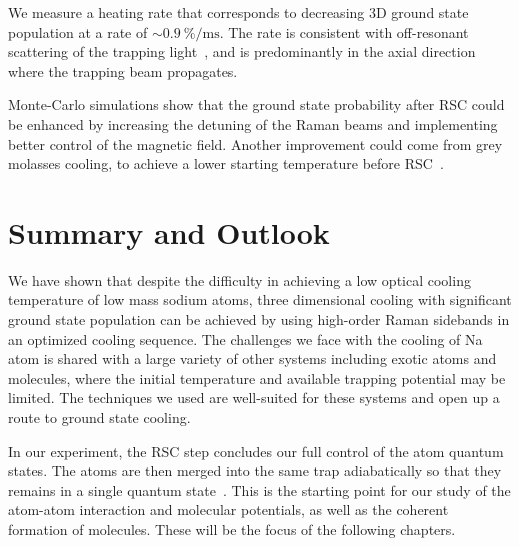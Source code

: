 We measure a heating rate that corresponds to decreasing 3D ground state population
at a rate of $\sim0.9~\mathrm{\%/ms}$.
The rate is consistent with off-resonant scattering of
the trapping light~\cite{grimm_optical_2000},
and is predominantly in the axial direction where the trapping beam propagates.

Monte-Carlo simulations show that the ground state probability after RSC
could be enhanced by increasing the detuning of the Raman beams and implementing
better control of the magnetic field. Another improvement could come from
grey molasses cooling,
to achieve a lower starting temperature before RSC~\cite{colzi_sub-doppler_2016}.

\section{Summary and Outlook}
\label{ch:rsc:summary}

We have shown that despite the difficulty in achieving a low optical cooling temperature
of low mass sodium atoms, three dimensional cooling
with significant ground state population can be achieved
by using high-order Raman sidebands in an optimized cooling sequence.
The challenges we face with the cooling of Na atom is shared with
a large variety of other systems including exotic atoms and molecules,
where the initial temperature and available trapping potential may be limited.
The techniques we used are well-suited for these systems
and open up a route to ground state cooling.

In our experiment, the RSC step concludes our full control of the atom quantum states.
The atoms are then merged into the same trap adiabatically
so that they remains in a single quantum state~\cite{liu_molecular_2019}.
This is the starting point for our study of
the atom-atom interaction and molecular potentials,
as well as the coherent formation of molecules.
These will be the focus of the following chapters.
